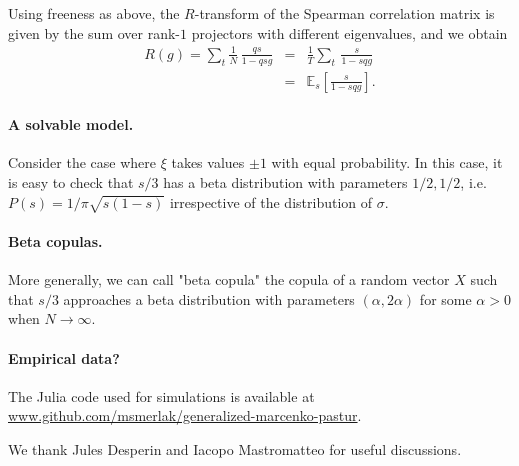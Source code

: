 \documentclass[
 prl,
 twocolumn,
 amsmath,
 amssymb,
 aps,
]{revtex4-2}
\begin{document}
Using freeness as above, the $R$-transform of the Spearman correlation matrix is given by the sum over rank-$1$ projectors with different eigenvalues, and we obtain 
\begin{eqnarray}
    R(g) = \sum_t \frac{1}{N}\,\frac{qs}{1-qsg} &=& \frac{1}{T}\sum_t\, \frac{s}{1-sqg}\\ &=&\mathbb{E}_s\left[\frac{s}{1-sqg}\right].
\end{eqnarray}

\paragraph*{A solvable model.}
Consider the case where $\xi$ takes values $\pm1$ with equal probability. 
In this case, it is easy to check that $s/3$ has a beta distribution with parameters $1/2, 1/2$, i.e. $P(s) = 1/\pi\sqrt{s(1-s)}$ irrespective of the distribution of $\sigma$.

\paragraph*{Beta copulas.}
More generally, we can call "beta copula" the copula of a random vector $X$ such that $s/3$ approaches a beta distribution with parameters $(\alpha, 2\alpha)$ for some $\alpha> 0$ when $N\to\infty$.


\paragraph*{Empirical data?}

\medskip

\medskip
The Julia code used for simulations is available at \url{www.github.com/msmerlak/generalized-marcenko-pastur}.

\medskip

\begin{acknowledgments}
We thank Jules Desperin and Iacopo Mastromatteo for useful discussions. 
\end{acknowledgments}

\medskip

% 
% 
\end{document}
